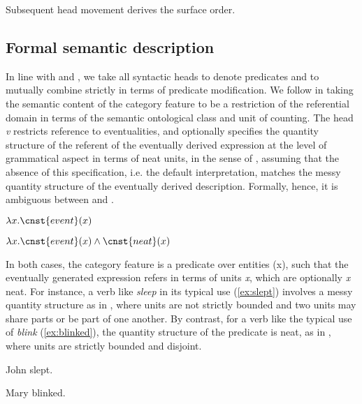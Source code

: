 \documentclass[output=paper,colorlinks,citecolor=brown]{langscibook}
\begin{document}
Subsequent head movement derives the surface order. 

\subsection{Formal semantic description} \label{str:subsect:Semantic formal description}

In line with \citet{Pietroski2005} and \citet{ArsenijevicHinzen2012}, we take all syntactic heads to denote predicates and to mutually combine strictly in terms of predicate modification. We follow \citet{Arsenijevic2017, sta+:Arsenijevic2022} in taking the semantic content of the category feature to be a restriction of the referential domain in terms of the semantic ontological class and unit of counting. The head \textit{v} restricts reference to eventualities, and optionally specifies the quantity structure of the referent of the eventually derived expression at the level of grammatical aspect in terms of neat units, in the sense of \citet{Landman2011}, assuming that the absence of this specification, i.e. the default interpretation, matches the messy quantity structure of the eventually derived description. Formally, hence, it is ambiguous between  and .

\ea\label{str:ex:sem}
\ea $\lambda x. \cnst{event}(x)$\label{str:ex:sem-a}

\ex $\lambda x.\cnst{event}(x) \wedge \cnst{neat}(x)$\label{str:ex:sem-b} 

\z
\z

\noindent In both cases, the category feature is a predicate over entities (x), such that the eventually generated expression refers in terms of units \textit{x}, which are optionally \textit{x} neat. For instance, a verb like \textit{sleep} in its typical use (\ref{ex:slept}) involves a messy quantity structure as in , where units are not strictly bounded and two units may share parts or be part of one another. By contrast, for a verb like the  typical use of \textit{blink} (\ref{ex:blinked}), the quantity structure of the predicate is neat, as in , where units are strictly bounded and disjoint.

\ea\label{str:ex:neatness}
\ea John slept. \label{ex:slept}

\ex Mary blinked. \label{ex:blinked}

\z
\z
\end{document}

